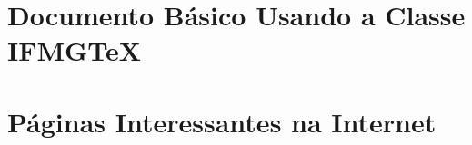 \documentclass[english,brazil]{ifmgtex}
\begin{document}


\apendices\partapendices

\chapter{Documento Básico Usando a Classe {IFMG\TeX}}



\anexos\partanexos

\chapter{Páginas Interessantes na Internet} \label{capitulo:paginas_interessantes}


\end{document}
